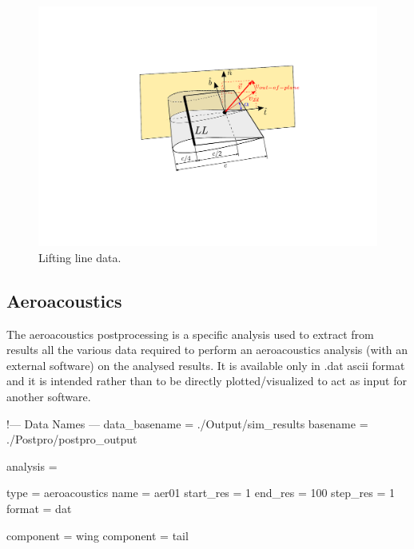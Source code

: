 \begin{figure}[h]
\centering
\includegraphics[width=1.0\textwidth, trim = 100 180 100 145, clip]{./images/ll_output_2} 
\caption{Lifting line data.}
\label{fig:ll_output}
\end{figure}



\subsection{Aeroacoustics}
The aeroacoustics postprocessing is a specific analysis used to 
extract from results all the various data required to perform an 
aeroacoustics analysis (with an external software) on the analysed results. 
It is available only in .dat ascii format  and it is intended rather than 
to be directly plotted/visualized to act as input for another software.

\begin{inputfile}[frame=single, caption={dust\_post.in for aeroacoustics}, 
  label={file:dust_post.in_aeroacoustics}]
!--- Data Names ---
data_basename = ./Output/sim_results
basename =     ./Postpro/postpro_output

analysis = {

type = aeroacoustics
name = aer01
start_res = 1
end_res   = 100 
step_res  = 1
format = dat

component = wing
component = tail

}
\end{inputfile}

